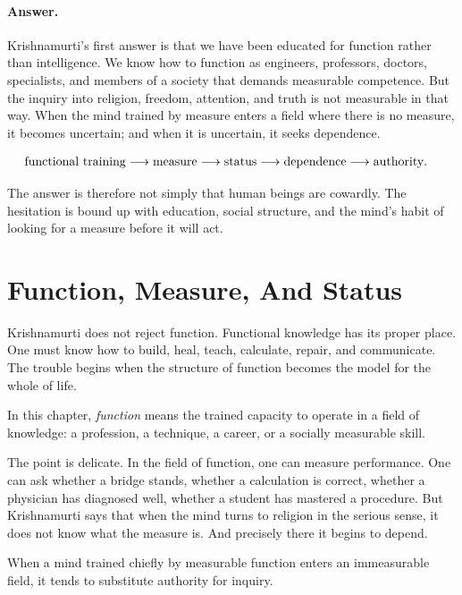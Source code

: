\paragraph{Answer.}
Krishnamurti's first answer is that we have been educated for function rather than intelligence. We know how to function as engineers, professors, doctors, specialists, and members of a society that demands measurable competence. But the inquiry into religion, freedom, attention, and truth is not measurable in that way. When the mind trained by measure enters a field where there is no measure, it becomes uncertain; and when it is uncertain, it seeks dependence.

\begin{align}
\hbox{functional training}
&\longrightarrow \hbox{measure}
\longrightarrow \hbox{status}
\longrightarrow \hbox{dependence}
\longrightarrow \hbox{authority}.
\end{align}

The answer is therefore not simply that human beings are cowardly. The hesitation is bound up with education, social structure, and the mind's habit of looking for a measure before it will act.

\section{Function, Measure, And Status}

Krishnamurti does not reject function. Functional knowledge has its proper place. One must know how to build, heal, teach, calculate, repair, and communicate. The trouble begins when the structure of function becomes the model for the whole of life.

\begin{definition}
In this chapter, \emph{function} means the trained capacity to operate in a field of knowledge: a profession, a technique, a career, or a socially measurable skill.
\end{definition}

The point is delicate. In the field of function, one can measure performance. One can ask whether a bridge stands, whether a calculation is correct, whether a physician has diagnosed well, whether a student has mastered a procedure. But Krishnamurti says that when the mind turns to religion in the serious sense, it does not know what the measure is. And precisely there it begins to depend.

\begin{proposition}
When a mind trained chiefly by measurable function enters an immeasurable field, it tends to substitute authority for inquiry.
\end{proposition}

